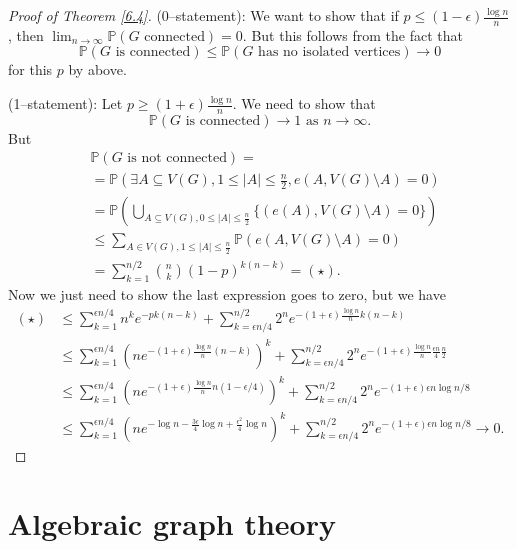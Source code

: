 \documentclass{article}
\theoremstyle{definition}
\begin{document}
\begin{proof}[Proof of Theorem \ref{6.4}]
    (0--statement): We want to show that if $p\le (1-\epsilon)\frac{\log n}{n}$, then $\lim_{n \to \infty} \mathbb{P}(G \text{ connected}) = 0$. But this follows from the fact that $$\mathbb{P}(G \text{ is connected})\le \mathbb{P}(G \text{ has no isolated vertices}) \to 0$$
    for this $p$ by above.
    \vspace{1mm}
    
    (1--statement): Let $p\ge (1+\epsilon)\frac{\log n}{n}$. We need to show that 
    \[
    \mathbb{P}(G \text{ is connected}) \to 1 \text{ as }n \to \infty.
    \]
    But 
    \begin{align*}
        &\mathbb{P}(G \text{ is not connected}) = \\
        &=\mathbb{P}(\exists A \subseteq V(G), 1\le |A|\le \frac{n}{2}, e(A,V(G)\setminus A)=0) \\
        & =\mathbb{P}\left( \bigcup_{A \subseteq V(G), 0\le |A|\le \frac{n}{2}} \{(e(A),V(G)\setminus A)=0\}\right) \\
        &\le \sum_{A \in V(G), 1\le |A|\le \frac{n}{2}}^{} \mathbb{P}(e(A,V(G)\setminus A)=0) \\
        &= \sum_{k=1}^{n/2} {n\choose{k}}(1-p)^{k(n-k)} = (\star).
    \end{align*}
    Now we just need to show the last expression goes to zero, but we have
    \begin{align*}
        (\star) &\le \sum_{k=1}^{\epsilon n/4} n^k e^{-pk(n-k)} + \sum_{k=\epsilon n/4}^{n/2} 2^n e^{-(1+\epsilon)\frac{\log n}{n}k(n-k)} \\
        &\le \sum_{k=1}^{\epsilon n/4} \left(n e^{-(1+\epsilon)\frac{\log n}{n}(n-k)}\right)^k + \sum_{k=\epsilon n/4}^{n/2} 2^n e^{-(1+\epsilon)\frac{\log n}{n} \frac{\epsilon n}{4} \frac{n}{2}} \\
        &\le \sum_{k=1}^{\epsilon n/4} \left(ne^{-(1+\epsilon)\frac{\log n}{n}n(1-\epsilon/4)}\right)^k + \sum_{k=\epsilon n/4}^{n/2} 2^n e^{-(1+\epsilon)\epsilon n\log n/8} \\
        &\le \sum_{k=1}^{\epsilon n/4} \left( n e^{-\log n - \frac{3 \epsilon}{4}\log n + \frac{\epsilon^2}{4}\log n} \right)^k + \sum_{k=\epsilon n/4}^{n/2} 2^n e^{-(1+\epsilon)\epsilon n\log n/8} \to 0.
    \end{align*} 
\end{proof}

\section{Algebraic graph theory}
\end{document}
